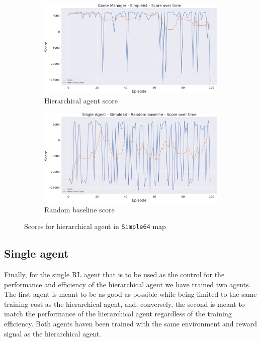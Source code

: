 \begin{figure}[t]
    \centering
    \begin{subfigure}[b]{0.48\textwidth}
        \includegraphics[width=1\textwidth]{figs/multi_dqn_game_manager/exploit/score.png}
        \caption{Hierarchical agent score}
    \end{subfigure}
    \hfill
    \begin{subfigure}[b]{0.48\textwidth}
        \includegraphics[width=1\textwidth]{figs/single_random/exploit/score.png}
        \caption{Random baseline score}
    \end{subfigure}
    \caption{Scores for hierarchical agent in \texttt{Simple64} map}
    \label{fig:hierarchical_Simple64_scores}
\end{figure}

\subsection{Single agent}

Finally, for the single RL agent that is to be used as the control for the performance and efficiency of the hierarchical agent we have trained two agents. The first agent is meant to be as good as possible while being limited to the same training cost as the hierarchical agent, and, conversely, the second is meant to match the performance of the hierarchical agent regardless of the training efficiency. Both agents haven been trained with the same environment and reward signal as the hierarchical agent.

